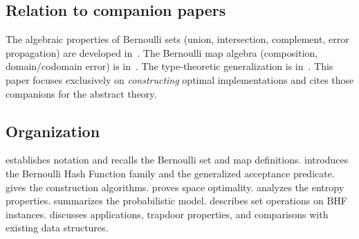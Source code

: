 \subsection*{Relation to companion papers}

The algebraic properties of Bernoulli sets (union, intersection, complement,
error propagation) are developed in~\cite{bernoulli_sets}.
The Bernoulli map algebra (composition, domain/codomain error) is
in~\cite{bernoulli_maps}.
The type-theoretic generalization is in~\cite{bernoulli_data_type}.
This paper focuses exclusively on \emph{constructing} optimal implementations
and cites those companions for the abstract theory.

\subsection*{Organization}

 establishes notation and recalls the Bernoulli set and map
definitions.
 introduces the Bernoulli Hash Function family and the
generalized acceptance predicate.
 gives the construction algorithms.
 proves space optimality.
 analyzes the entropy properties.
 summarizes the probabilistic model.
 describes set operations on BHF instances.
 discusses applications, trapdoor properties, and comparisons
with existing data structures.
